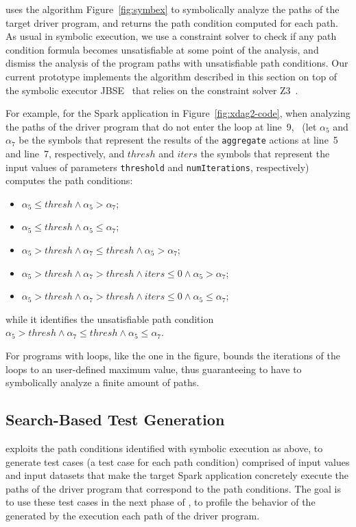 \approach uses the algorithm Figure~\ref{fig:symbex} to symbolically analyze the paths of the target driver program, and returns the path condition computed for each path. As usual in symbolic execution, we use a constraint solver to check if any path condition formula becomes unsatisfiable at some point of the analysis, and dismiss the analysis of the program paths with unsatisfiable path conditions.  Our current \approach prototype implements the algorithm described in this section on top of the symbolic executor JBSE~\cite{braione:jbse:fse:2016} that relies on the constraint solver Z3~\cite{demoura:z3:tacas:2008}.

For example, for the Spark application in Figure~\ref{fig:xdag2-code}, when analyzing the paths of the driver program that do not enter the loop at line~9, 
\ (let $\alpha_5$ and $\alpha_7$ be the symbols that represent the results of the \texttt{aggregate} actions at line~5 and line~7, respectively, and $thresh$ and $iters$ the symbols that represent the input values of parameters \texttt{threshold} and \texttt{numIterations}, respectively) \approach computes the path conditions:
\begin{itemize} 
	\item \(\alpha_5 \le thresh \wedge \alpha_5 > \alpha_7\);
	\item \(\alpha_5 \le thresh \wedge \alpha_5 \le \alpha_7\);
	\item \(\alpha_5 > thresh \wedge \alpha_7 \le thresh \wedge \alpha_5 > \alpha_7\);
	\item \(\alpha_5 > thresh \wedge \alpha_7 > thresh \wedge iters \le 0 \wedge  \alpha_5 > \alpha_7\);
	\item \(\alpha_5 > thresh \wedge \alpha_7 > thresh \wedge iters \le 0 \wedge  \alpha_5 \le \alpha_7\);
	
\end{itemize}
%
while it identifies the unsatisfiable path condition \(\alpha_5 > thresh \wedge \alpha_7 \le thresh \wedge \alpha_5 \le \alpha_7\).

For programs with loops, like the one in the figure, \approach bounds the iterations of the loops to an user-defined maximum value, thus guaranteeing to have to symbolically analyze a finite amount of paths. 

\subsection{Search-Based Test Generation}
\approach exploits the path conditions identified with symbolic execution as above, to generate test cases (a test case for each path condition) comprised of input values and input datasets that make the target Spark application concretely execute  the  paths of the driver program that correspond to the path conditions. The goal is to use these test cases in the next phase of \approach,  to profile the behavior of the \plan generated by the execution each path of the driver program.

